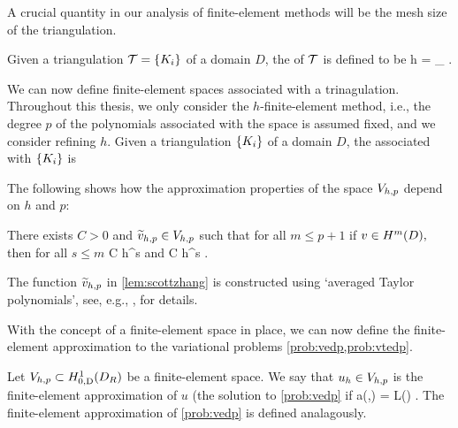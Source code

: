    A crucial quantity in our analysis of finite-element methods will be the mesh size of the triangulation.

Given a triangulation $\cT = \set{\Ki}$ of a domain $D$, the  of $\mathcal T$ is defined to be
\beqs
h = \max_{\Ki} \diam{\Ki}.
\eeqs
\ede{}

    We can now define finite-element spaces associated with a trinagulation. Throughout this thesis, we only consider the $h$-finite-element method, i.e., the degree $p$ of the polynomials associated with the space is assumed fixed, and we consider refining $h.$
    Given a triangulation $\set{\Ki}$ of a domain $D$, the  associated with $\set{\Ki}$ is
    \beqs
\Vhp \de {}
    \eeqs{}
    \ede

    The following  shows how the approximation properties of the space $V_{h,p}$ depend on $h$ and $p$:

    \label{lem:fespaceapprox}
    There exists $C>0$ and $\widetilde{v}_{h,p} \in V_{h,p}$ such that for all $m \leq p+1$ if $v \in \HmD,$ then for all $s \leq m$
    \beqs
{} \leq C h^s 
    \eeqs
    and
    \beqs
{} \leq C h^s .
    \eeqs
    \ele

The function $\widetilde{v}_{h,p}$ in \cref{lem:scottzhang} is constructed using `averaged Taylor polynomials', see, e.g., \cite{ScZh:90},\cite[Section 4.4]{BrSc:08} for details.
    \ere

    With the concept of a finite-element space in place, we can now define the finite-element approximation to the variational problems \cref{prob:vedp,prob:vtedp}.

    \label{prob:fevtedp}
    Let $\Vhp \subset \HozDDR$ be a finite-element space. We say that $u_{h} \in V_{h,p}$ is the finite-element approximation of $u$ (the solution to \cref{prob:vedp} if
    \beqs
    a(\uh,\vh) = L(\vh) \tforall \vh \in \Vhp.
    The finite-element approximation of \cref{prob:vedp} is defined analagously.
    \eeqs
    \eprob


